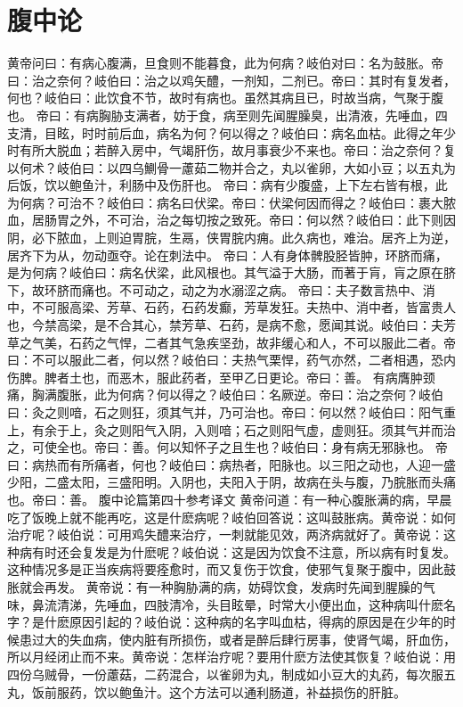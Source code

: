 \documentclass[a4paper,12pt,UTF8,twoside]{ctexbook}
\begin{document}
\chapter{腹中论}
黄帝问曰：有病心腹满，旦食则不能暮食，此为何病？岐伯对曰：名为鼓胀。帝曰：治之奈何？岐伯曰：治之以鸡矢醴，一剂知，二剂已。帝曰：其时有复发者，何也？岐伯曰：此饮食不节，故时有病也。虽然其病且已，时故当病，气聚于腹也。
帝曰：有病胸胁支满者，妨于食，病至则先闻腥臊臭，出清液，先唾血，四支清，目眩，时时前后血，病名为何？何以得之？岐伯曰：病名血枯。此得之年少时有所大脱血；若醉入房中，气竭肝伤，故月事衰少不来也。帝曰：治之奈何？复以何术？岐伯曰：以四乌鰂骨一藘茹二物并合之，丸以雀卵，大如小豆；以五丸为后饭，饮以鲍鱼汁，利肠中及伤肝也。
帝曰：病有少腹盛，上下左右皆有根，此为何病？可治不？岐伯曰：病名曰伏梁。帝曰：伏梁何因而得之？岐伯曰：裹大脓血，居肠胃之外，不可治，治之每切按之致死。帝曰：何以然？岐伯曰：此下则因阴，必下脓血，上则迫胃脘，生鬲，侠胃脘内痈。此久病也，难治。居齐上为逆，居齐下为从，勿动亟夺。论在刺法中。
帝曰：人有身体髀股胫皆肿，环脐而痛，是为何病？岐伯曰：病名伏梁，此风根也。其气溢于大肠，而著于肓，肓之原在脐下，故环脐而痛也。不可动之，动之为水溺涩之病。
帝曰：夫子数言热中、消中，不可服高梁、芳草、石药，石药发癫，芳草发狂。夫热中、消中者，皆富贵人也，今禁高梁，是不合其心，禁芳草、石药，是病不愈，愿闻其说。岐伯曰：夫芳草之气美，石药之气悍，二者其气急疾坚劲，故非缓心和人，不可以服此二者。帝曰：不可以服此二者，何以然？岐伯曰：夫热气栗悍，药气亦然，二者相遇，恐内伤脾。脾者土也，而恶木，服此药者，至甲乙日更论。帝曰：善。
有病膺肿颈痛，胸满腹胀，此为何病？何以得之？岐伯曰：名厥逆。帝曰：治之奈何？岐伯曰：灸之则喑，石之则狂，须其气并，乃可治也。帝曰：何以然？岐伯曰：阳气重上，有余于上，灸之则阳气入阴，入则喑；石之则阳气虚，虚则狂。须其气并而治之，可使全也。帝曰：善。何以知怀子之且生也？岐伯曰：身有病无邪脉也。
帝曰：病热而有所痛者，何也？岐伯曰：病热者，阳脉也。以三阳之动也，人迎一盛少阳，二盛太阳，三盛阳明。入阴也，夫阳入于阴，故病在头与腹，乃脘胀而头痛也。帝曰：善。
腹中论篇第四十参考译文
黄帝问道：有一种心腹胀满的病，早晨吃了饭晚上就不能再吃，这是什麽病呢？岐伯回答说：这叫鼓胀病。黄帝说：如何治疗呢？岐伯说：可用鸡失醴来治疗，一刺就能见效，两济病就好了。黄帝说：这种病有时还会复发是为什麽呢？岐伯说：这是因为饮食不注意，所以病有时复发。这种情况多是正当疾病将要痊愈时，而又复伤于饮食，使邪气复聚于腹中，因此鼓胀就会再发。
黄帝说：有一种胸胁满的病，妨碍饮食，发病时先闻到腥臊的气味，鼻流清涕，先唾血，四肢清冷，头目眩晕，时常大小便出血，这种病叫什麽名字？是什麽原因引起的？岐伯说：这种病的名字叫血枯，得病的原因是在少年的时候患过大的失血病，使内脏有所损伤，或者是醉后肆行房事，使肾气竭，肝血伤，所以月经闭止而不来。黄帝说：怎样治疗呢？要用什麽方法使其恢复？岐伯说：用四份乌贼骨，一份藘菇，二药混合，以雀卵为丸，制成如小豆大的丸药，每次服五丸，饭前服药，饮以鲍鱼汁。这个方法可以通利肠道，补益损伤的肝脏。
\end{document}
